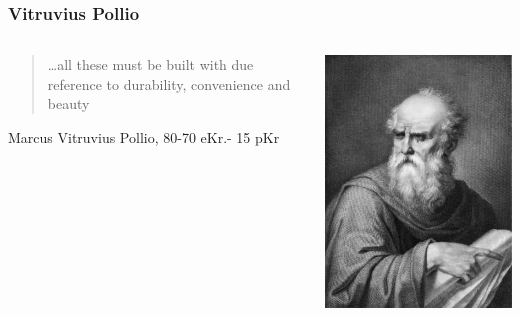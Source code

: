 \begin{frame}[fragile]
	\frametitle{Vitruvius Pollio}
	\begin{columns}[t]
		\begin{column}{7cm}
			\begin{center}
				\begin{quote}
					\ldots all these must be built with due reference to durability, convenience and beauty
				\end{quote}
			\end{center}
			\vskip 1cm
			Marcus Vitruvius Pollio, 80-70 eKr.- 15 pKr  \citep{pollio1914vitruvius}
		\end{column}
		\begin{column}[T]{3cm}
			\includegraphics[width=\textwidth]{vitruvio.jpg}
		\end{column}
	\end{columns}
\end{frame}

